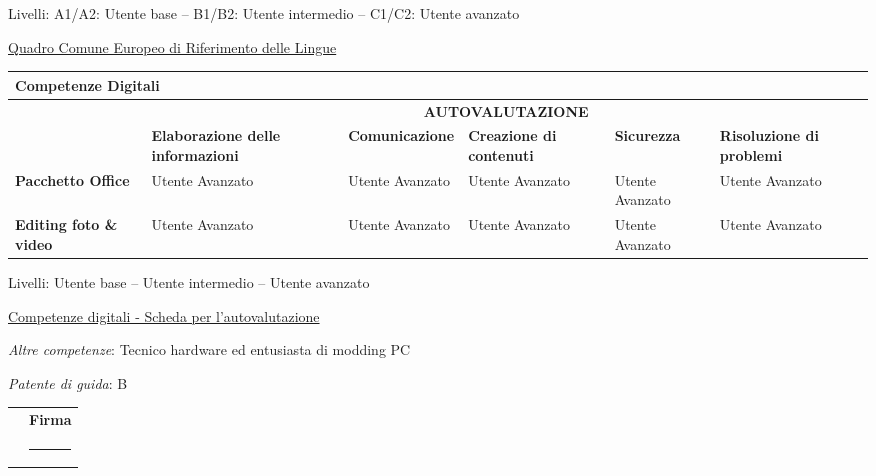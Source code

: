 \documentclass[a4paper, 10pt]{article}
\begin{document}
	\vspace{4pt}
	{\footnotesize
		Livelli: A1/A2: Utente base – B1/B2: Utente intermedio – C1/C2: Utente avanzato \par
		\href{https://europass.europa.eu/it/common-european-framework-reference-language-skills}{Quadro Comune Europeo di Riferimento delle Lingue}
	}\vspace{4pt}
	
	\begin{table}[H]
		\centering
		\renewcommand\arraystretch{1.5}
		\renewcommand\tabularxcolumn[1]{>{\centering\arraybackslash}m{#1}}
		\setlength{\tabcolsep}{6pt}
		\begin{tabularx}{\textwidth}{l*{5}{X}}
			\multicolumn{6}{l}{\textbf{{Competenze Digitali}}} \\[4pt]
			\toprule
			& \multicolumn{5}{c}{\textbf{{AUTOVALUTAZIONE}}} \\
			\cmidrule(lr){2-6}
			& {\textbf{Elaborazione delle informazioni}}
			& {\textbf{Comunicazione}}
			& {\textbf{Creazione di contenuti}}
			& {\textbf{Sicurezza}}
			& {\textbf{Risoluzione di problemi}} \\
			\midrule
			\textbf{Pacchetto Office} & Utente Avanzato & Utente Avanzato & Utente Avanzato & Utente Avanzato & Utente Avanzato \\
			\textbf{Editing foto \& video} & Utente Avanzato & Utente Avanzato & Utente Avanzato & Utente Avanzato & Utente Avanzato \\
			\bottomrule
		\end{tabularx}
		
		\vspace{4pt}
		{\footnotesize
			{Livelli: Utente base – Utente intermedio – Utente avanzato} \par
			\href{https://www.cittadinanzadigitale.eu/wp-content/uploads/2015/10/Competenze-digitali.pdf}{Competenze digitali - Scheda per l'autovalutazione}
		}
	\end{table}
	
	\skillListStart
	\justifying
	\item \emph{Altre competenze}: Tecnico hardware ed entusiasta di modding PC
	\item \emph{Patente di guida}: B
	\skillListEnd
	
	
	\vspace{1cm}
	
	
	\begin{tabularx}{\textwidth}{>{\centering\arraybackslash}X >{\centering\arraybackslash}X}
		{\textbf{Data}} &
		{\textbf{Firma}} \\[0.3cm]
		\rule{4cm}{0.3pt} & \rule{4cm}{0.3pt} \\[-0.1cm]
	\end{tabularx}
	
\end{document}
